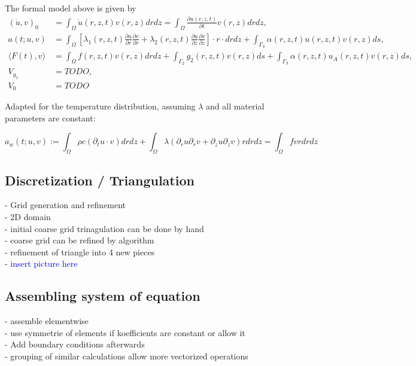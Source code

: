 \documentclass[parskip=half, titlepage=yes, 12pt, BCOR=12mm, DIV=calc]{scrartcl}
\begin{document}
The formal model above is given by 
\begin{align*}
    (\Dot{u},v)_0 &= \int_{\Omega} \Dot{u}(r,z,t)v(r,z) drdz = \int_{\Omega} \frac{\partial u(r,z,t)}{\partial t} v(r,z) drdz, \\
    a(t;u,v) &= \int_{\Omega} \left[ \lambda_1(r,z,t) \frac{\partial u}{\partial r} \frac{\partial v}{\partial r} + \lambda_2(r,z,t) \frac{\partial u}{\partial z} \frac{\partial v}{\partial z} \right] \cdot r \cdot drdz + \int_{\Gamma_3} \alpha(r,z,t)u(r,z,t)v(r,z) ds, \\
    \langle F(t),v \rangle &= \int_{\Omega} f(r,z,t)v(r,z) drdz + \int_{\Gamma_2} g_2(r,z,t)v(r,z) ds + \int_{\Gamma_3} \alpha(r,z,t)u_A(r,z,t)v(r,z) ds, \\
    V_{g_1} &= TODO, \\
    V_0 &= TODO
\end{align*}

Adapted for the temperature distribution, assuming $\lambda$ and all material parameters are constant: 

\begin{equation}
    a_w(t;u,v) := \int_{\Omega} \rho c (\partial_t u \cdot v) drdz + \int_{\Omega} \lambda (\partial_r u \partial_r v + \partial_z u \partial_z v) r drdz = \int_{\Omega} f v r dr dz
\end{equation}

\newpage

\subsection{Discretization / Triangulation}

- Grid generation and refinement \\
- 2D domain \\
- initial coarse grid trinagulation can be done by hand \\
- coarse grid can be refined by algorithm \\

- refinement of triangle into 4 new pieces \\
- \textcolor{blue}{insert picture here}

\subsection{Assembling system of equation}

- assemble elementwise \\
- use symmetrie of elements if koefficients are constant or allow it \\
- Add boundary conditions afterwards \\
- grouping of similar calculations allow more vectorized operations \\ 
\end{document}
